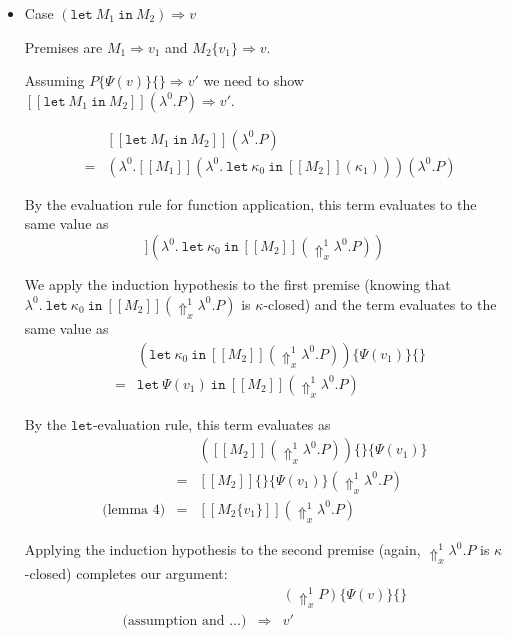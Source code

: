 \documentclass[a4paper,11pt]{article}
\begin{document}
\begin{itemize}
\begin{itemize}
\end{itemize}

\item{Case $(\texttt{let} \: M_{1} \: \texttt{in} \: M_{2}) \Rightarrow v$}

Premises are $M_{1} \Rightarrow v_{1}$ and $M_{2}\{v_{1}\} \Rightarrow v$.

Assuming $P\{\Psi(v)\}\{\} \Rightarrow v'$ we need to show
$[\![\texttt{let} \: M_{1} \: \texttt{in} \: M_{2}]\!](\lambda^{0}.P) \Rightarrow v'$.

\begin{eqnarray*}
 &   & [\![\texttt{let} \: M_{1} \: \texttt{in} \: M_{2}]\!](\lambda^{0}.P) \\
 & = & (\lambda^{0}.[\![M_{1}]\!](\lambda^{0}. \: \texttt{let} \: \kappa_{0} \: \texttt{in} \: [\![M_{2}]\!](\kappa_{1})))(\lambda^{0}.P)
\end{eqnarray*}

By the evaluation rule for function application, this term evaluates to the same value as
\begin{displaymath}
[\![M_{1}]\!](\lambda^{0}. \: \texttt{let} \: \kappa_{0} \: \texttt{in} \: [\![M_{2}]\!](\Uparrow_{x}^{1} \lambda^{0}.P))
\end{displaymath}

We apply the induction hypothesis to the first premise (knowing that $\lambda^{0}. \: \texttt{let} \: \kappa_{0} \: \texttt{in} \: [\![M_{2}]\!](\Uparrow_{x}^{1} \lambda^{0}.P)$
is $\kappa$-closed) and the term evaluates to the same value as
\begin{eqnarray*}
 &   & (\texttt{let} \: \kappa_{0} \: \texttt{in} \: [\![M_{2}]\!](\Uparrow_{x}^{1} \lambda^{0}.P))\{\Psi(v_{1})\}\{\} \\
 & = & \texttt{let} \: \Psi(v_{1}) \: \texttt{in} \: [\![M_{2}]\!](\Uparrow_{x}^{1} \lambda^{0}.P)
\end{eqnarray*}

By the $\texttt{let}$-evaluation rule, this term evaluates as
\begin{eqnarray*}
                 &   & ([\![M_{2}]\!](\Uparrow_{x}^{1} \lambda^{0}.P))\{\}\{\Psi(v_{1})\} \\
                 & = & [\![M_{2}]\!]\{\}\{\Psi(v_{1})\}(\Uparrow_{x}^{1} \lambda^{0}.P) \\
\mbox{(lemma 4)} & = & [\![M_{2}\{v_{1}\}]\!](\Uparrow_{x}^{1} \lambda^{0}.P)
\end{eqnarray*}

Applying the induction hypothesis to the second premise (again, $\Uparrow_{x}^{1} \lambda^{0}.P$ is $\kappa$-closed)
completes our argument:
\begin{eqnarray*}
                               &             & (\Uparrow_{x}^{1}P)\{\Psi(v)\}\{\} \\
\mbox{(assumption and \ldots)} & \Rightarrow & v'
\end{eqnarray*}


\end{itemize}
\end{document}
